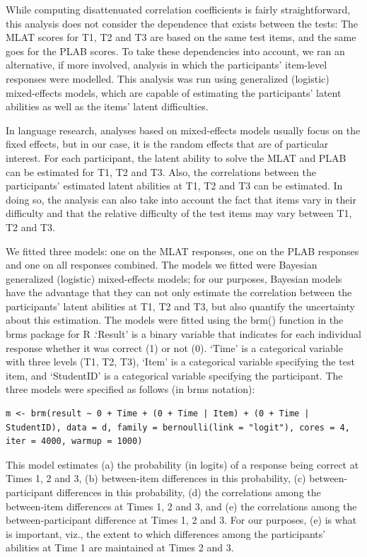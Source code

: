 \documentclass[output=paper]{langsci/langscibook}
\begin{document}
While computing disattenuated correlation coefficients is fairly straightforward, this analysis does not consider the dependence that exists between the tests: The MLAT scores for T1, T2 and T3 are based on the same test items, and the same goes for the PLAB scores. To take these dependencies into account, we ran an alternative, if more involved, analysis in which the participants’ item-level responses were modelled. This analysis was run using generalized (logistic) mixed-effects models, which are capable of estimating the participants’ latent abilities as well as the items’ latent difficulties.

In language research, analyses based on mixed-effects models usually focus on the fixed effects, but in our case, it is the random effects that are of particular interest. For each participant, the latent ability to solve the MLAT and PLAB can be estimated for T1, T2 and T3. Also, the correlations between the participants’ estimated latent abilities at T1, T2 and T3 can be estimated. In doing so, the analysis can also take into account the fact that items vary in their difficulty and that the relative difficulty of the test items may vary between T1, T2 and T3. 

We fitted three models: one on the MLAT responses, one on the PLAB responses and one on all responses combined. The models we fitted were Bayesian generalized (logistic) mixed-effects models; for our purposes, Bayesian models have the advantage that they can not only estimate the correlation between the participants’ latent abilities at T1, T2 and T3, but also quantify the uncertainty about this estimation. The models were fitted using the brm() function in the brms package for R \citep{Buerkner2017}.‘Result’ is a binary variable that indicates for each individual response whether it was correct (1) or not (0). ‘Time’ is a categorical variable with three levels (T1, T2, T3), ‘Item’ is a categorical variable specifying the test item, and ‘StudentID’ is a categorical variable specifying the participant. The three models were specified as follows (in brms notation):

\begin{lstlisting}
m <- brm(result ~ 0 + Time + (0 + Time | Item) + (0 + Time | StudentID), data = d, family = bernoulli(link = "logit"), cores = 4, iter = 4000, warmup = 1000)
\end{lstlisting}

This model estimates (a) the probability (in logits) of a response being correct at Times 1, 2 and 3, (b) between-item differences in this probability, (c) between-participant differences in this probability, (d) the correlations among the between-item differences at Times 1, 2 and 3, and (e) the correlations among the between-participant difference at Times 1, 2 and 3. For our purposes, (e) is what is important, viz., the extent to which differences among the participants’ abilities at Time 1 are maintained at Times 2 and 3.
\end{document}
